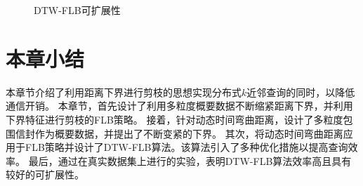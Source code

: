    \begin{figure} [t]
   	\centering
   	\caption{DTW-FLB可扩展性}
   	\label{fig:HpaaScalability}
   \end{figure}
   
  
\section{本章小结}\label{sec-c5-conclusion}
本章节介绍了利用距离下界进行剪枝的思想实现分布式$k$近邻查询的同时，以降低通信开销。
本章节，首先设计了利用多粒度概要数据不断缩紧距离下界，并利用下界特征进行剪枝的FLB策略。
接着，针对动态时间弯曲距离，设计了多粒度包围信封作为概要数据，并提出了不断变紧的下界。
其次，将动态时间弯曲距离应用于FLB策略并设计了DTW-FLB算法。该算法引入了多种优化措施以提高查询效率。
最后，通过在真实数据集上进行的实验，表明DTW-FLB算法效率高且具有较好的可扩展性。


%
%
%

\clearpage
\phantom{s}
\clearpage
